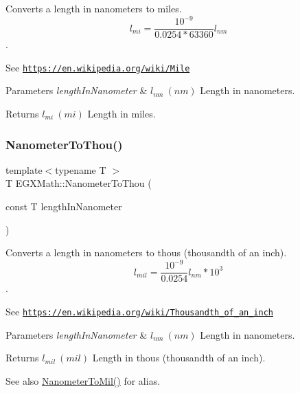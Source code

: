 Converts a length in nanometers to miles. \[ l_{mi}=\frac{10^{-9}}{0.0254 * 63360} l_{nm} \]. 

See \href{https://en.wikipedia.org/wiki/Mile}{\tt https\+://en.\+wikipedia.\+org/wiki/\+Mile} 
\begin{DoxyParams}{Parameters}
{\em length\+In\+Nanometer} & $ l_{nm}\ (nm)$ Length in nanometers. \\
\hline
\end{DoxyParams}
\begin{DoxyReturn}{Returns}
$ l_{mi}\ (mi)$ Length in miles. 
\end{DoxyReturn}
\mbox{\label{group___e_g_x_math-_conversions-_length_conversions-_nanometer-_imperial_ga4c714a8d3ab333da358dafe181ebdcc4}} 
\subsubsection{\texorpdfstring{Nanometer\+To\+Thou()}{NanometerToThou()}}
{\footnotesize\ttfamily template$<$typename T $>$ \\
T E\+G\+X\+Math\+::\+Nanometer\+To\+Thou (\begin{DoxyParamCaption}\item[{const T}]{length\+In\+Nanometer }\end{DoxyParamCaption})}



Converts a length in nanometers to thous (thousandth of an inch). \[ l_{mil}= \frac{10^{-9}}{0.0254} l_{nm} * 10^{3} \]. 

See \href{https://en.wikipedia.org/wiki/Thousandth_of_an_inch}{\tt https\+://en.\+wikipedia.\+org/wiki/\+Thousandth\+\_\+of\+\_\+an\+\_\+inch} 
\begin{DoxyParams}{Parameters}
{\em length\+In\+Nanometer} & $ l_{nm}\ (nm)$ Length in nanometers. \\
\hline
\end{DoxyParams}
\begin{DoxyReturn}{Returns}
$ l_{mil}\ (mil)$ Length in thous (thousandth of an inch). 
\end{DoxyReturn}
\begin{DoxySeeAlso}{See also}
\mbox{\hyperlink{group___e_g_x_math-_conversions-_length_conversions-_nanometer-_imperial_gacfd62a86ae9a5085569840f3b7bbdb3e}{Nanometer\+To\+Mil()}} for alias. 
\end{DoxySeeAlso}
\mbox{\label{group___e_g_x_math-_conversions-_length_conversions-_nanometer-_imperial_ga1f2313a0bf1527690778a6dace0db853}} 
